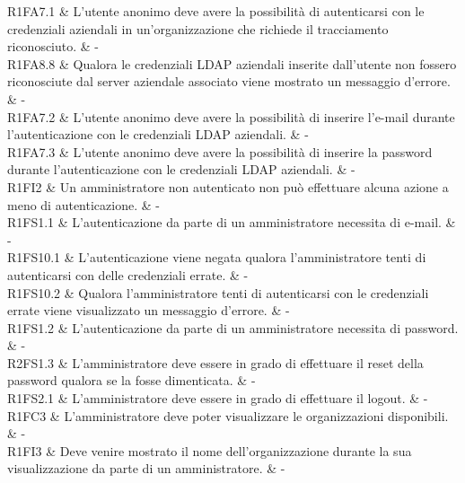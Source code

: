 
R1FA7.1 & L'utente anonimo deve avere la possibilità di autenticarsi con le credenziali aziendali in un'organizzazione che richiede il tracciamento riconosciuto.  & - \\

R1FA8.8 & Qualora le credenziali LDAP aziendali inserite dall'utente non fossero riconosciute dal server aziendale associato viene mostrato un messaggio d'errore.  & - \\

R1FA7.2 & L'utente anonimo deve avere la possibilità di inserire l'e-mail durante l'autenticazione con le credenziali LDAP aziendali.  & - \\

R1FA7.3 & L'utente anonimo deve avere la possibilità di inserire la password durante l'autenticazione con le credenziali LDAP aziendali.  & - \\

R1FI2 & Un amministratore non autenticato non può effettuare alcuna azione a meno di autenticazione.  & - \\

R1FS1.1 & L’autenticazione da parte di un amministratore necessita di e-mail. & - \\

R1FS10.1 & L’autenticazione viene negata qualora l'amministratore tenti di autenticarsi con delle credenziali errate.  & - \\

R1FS10.2 & Qualora l'amministratore tenti di autenticarsi con le credenziali errate viene visualizzato un messaggio d’errore.  & - \\

R1FS1.2 & L’autenticazione da parte di un amministratore necessita di password. & - \\

R2FS1.3 & L'amministratore deve essere in grado di effettuare il reset della password qualora se la fosse dimenticata. & - \\

R1FS2.1 & L'amministratore deve essere in grado di effettuare il logout. & - \\

R1FC3 & L'amministratore deve poter visualizzare le organizzazioni disponibili. & - \\

R1FI3 & Deve venire mostrato il nome dell'organizzazione durante la sua visualizzazione da parte di un amministratore.  & - \\

